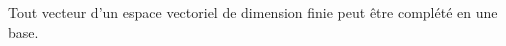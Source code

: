 Tout vecteur d'un espace vectoriel de dimension finie peut être complété en une base.

\begin{reponses}
\end{reponses}

